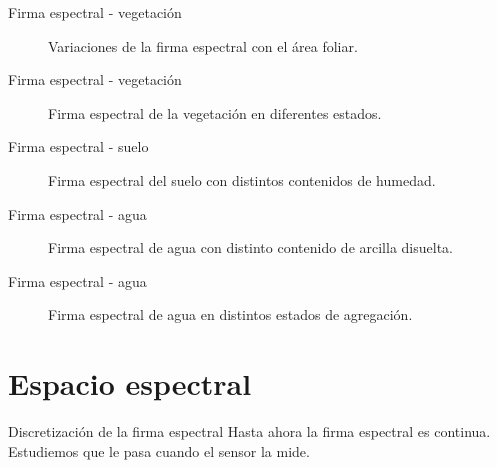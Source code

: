 \documentclass[handout,draft]{beamer}
\begin{document}
\begin{frame}{Firma espectral - vegetación}
  \begin{figure}
  \centering
  \caption{Variaciones de la firma espectral con el área foliar.}
  \end{figure}
\end{frame}

\begin{frame}{Firma espectral - vegetación}
    \begin{figure}
    \centering
    \caption{Firma espectral de la vegetación en diferentes estados.}
    \end{figure}
\end{frame}

\begin{frame}{Firma espectral - suelo}
    \begin{figure}
    \centering
    \caption{Firma espectral del suelo con distintos contenidos de humedad.}
    \end{figure}
\end{frame}

\begin{frame}{Firma espectral - agua}
    \begin{figure}
    \centering
    \caption{Firma espectral de agua con distinto contenido de arcilla disuelta.}
    \end{figure}
\end{frame}

\begin{frame}{Firma espectral - agua}
    \begin{figure}
    \centering
    \caption{Firma espectral de agua en distintos estados de agregación.}
    \end{figure}
\end{frame}

\section{Espacio espectral}
\begin{frame}{Discretización de la firma espectral}
  Hasta ahora la firma espectral es continua. Estudiemos que le pasa cuando el sensor la mide.
\end{frame}
\end{document}
